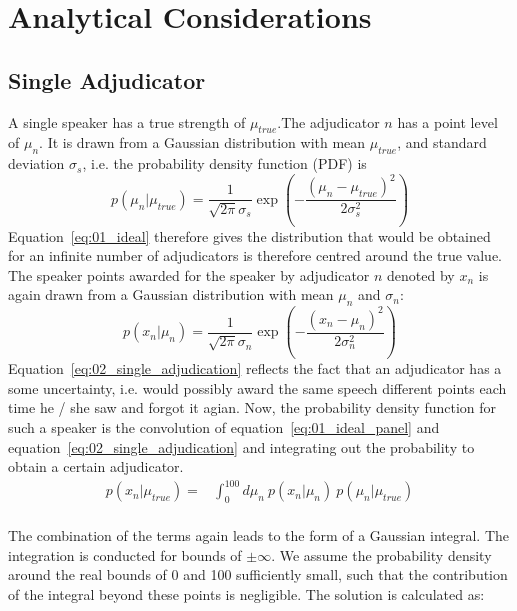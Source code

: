 \documentclass[%
 reprint,
 amsmath,amssymb,
 aps,
]{revtex4-1}
\begin{document}
\section{Analytical Considerations}

\subsection{Single Adjudicator}

A single speaker has a true strength of $\mu_{true}$.The adjudicator $n$ has a point level of $\mu_n$. It is drawn from a Gaussian distribution with mean $\mu_{true}$, and standard deviation $\sigma_s$, i.e. the probability density function (PDF) is
\begin{equation}
p(\mu_n | \mu_{true}) = \frac{1}{\sqrt{2\pi} \sigma_s} \exp\left(-\frac{(\mu_n - \mu_{true})^2}{2\sigma_s^2}\right)
\label{eq:01_ideal_panel}
\end{equation}
Equation~\ref{eq:01_ideal} therefore gives the distribution that would be obtained for an infinite number of adjudicators is therefore centred around the true value. The speaker points awarded for the speaker by adjudicator $n$ denoted by $x_n$ is again drawn from a Gaussian distribution with mean $\mu_n$ and $\sigma_n$:
\begin{equation}
p(x_n | \mu_n) = \frac{1}{\sqrt{2\pi} \sigma_n} \exp\left(-\frac{(x_n - \mu_n)^2}{2\sigma_n^2}\right)
\label{eq:02_single_adjudication}
\end{equation}
Equation~\ref{eq:02_single_adjudication} reflects the fact that an adjudicator has a some uncertainty, i.e. would possibly award the same speech different points each time he / she saw and forgot it agian. Now, the probability density function for such a speaker is the convolution of equation~\ref{eq:01_ideal_panel} and equation~\ref{eq:02_single_adjudication} and integrating out the probability to obtain a certain adjudicator. 
\begin{align}
p(x_n|\mu_{true}) =& \int_0^{100} d\mu_n\: p(x_n|\mu_n)\: p(\mu_n|\mu_{true})\\
\end{align}

The combination of the terms again leads to the form of a Gaussian integral. The integration is conducted for bounds of $\pm \infty$. We assume the probability density around the real bounds of 0 and 100 sufficiently small, such that the contribution of the integral beyond these points is negligible. The solution is calculated as:
\end{document}
